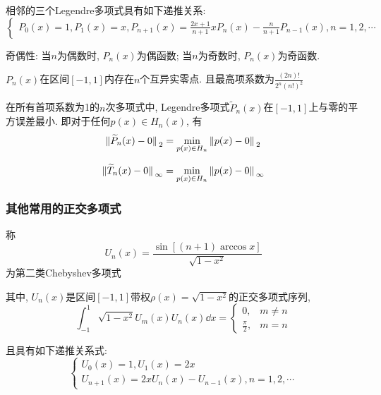 相邻的三个Legendre多项式具有如下递推关系:
\begin{equation*}
    \begin{cases}
        P_0(x)=1, P_1(x)=x,
        P_{n+1}(x)=\frac{2x+1}{n+1}xP_n(x)-\frac{n}{n+1}P_{n-1}(x), n=1,2,\cdots
    \end{cases}
\end{equation*}

奇偶性: 当$n$为偶数时, $P_n(x)$为偶函数; 当$n$为奇数时, $P_n(x)$为奇函数.

$P_n(x)$在区间$[-1,1]$内存在$n$个互异实零点. 且最高项系数为$\frac{(2n)!}{2^n(n!)^2}$

在所有首项系数为1的$n$次多项式中, Legendre多项式$\widetilde{P}_n(x)$在$[-1,1]$上与零的平方误差最小. 即对于任何$p(x)\in H_n(x)$, 有
\begin{equation*}
    \norm*{\widetilde{P}_n(x)-0}_2=\min_{p(x)\in H_n}\norm*{p(x)-0}_2
\end{equation*}

\begin{extend}
    \begin{equation*}
        \norm*{\widetilde{T}_n(x)-0}_\infty=\min_{p(x)\in H_n}\norm*{p(x)-0}_\infty
    \end{equation*}
\end{extend}

\subsubsection{其他常用的正交多项式}

\begin{definition}[第二类Chebyshev多项式]
    称
    \begin{equation*}
        U_n(x)=\frac{\sin\left[(n+1)\arccos{x}\right]}{\sqrt{1-x^2}}
    \end{equation*}
    为第二类Chebyshev多项式
\end{definition}

其中, ${U_n(x)}$是区间$[-1,1]$带权$\rho(x)=\sqrt{1-x^2}$的正交多项式序列,
\begin{equation*}
    \int_{-1}^1\sqrt{1-x^2}U_m(x)U_n(x)\dd{x}=
    \begin{cases}
        0,&m\ne n\\
        \frac{\pi}{2},&m=n
    \end{cases}
\end{equation*}

且具有如下递推关系式:
\begin{equation*}
    \begin{cases}
        U_0(x)=1, U_1(x)=2x\\
        U_{n+1}(x)=2xU_n(x)-U_{n-1}(x), n=1,2,\cdots
    \end{cases}
\end{equation*}

